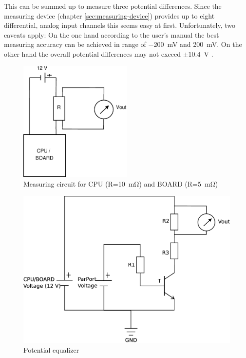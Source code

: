 This can be summed up to measure three potential differences. Since the
measuring device (chapter \ref{sec:measuring-device}) provides up to eight
differential, analog input channels this seems easy at first. Unfortunately,
two caveats apply: On the one hand according to the user's manual
\cite{NIManual2009} the best measuring accuracy can be achieved in range of
\SI{-200}{\milli\volt} and \SI{200}{\milli\volt}. On the other hand the overall
potential differences may not exceed $\pm$\SI{10.4}{\volt} \cite{NISpec2009}.

\begin{figure}
  \centering
    \includegraphics[width=0.5\textwidth]{fig/measuring-circuit.eps}
  \caption{Measuring circuit for CPU (R=\SI{10}{\milli\ohm}) and BOARD
(R=\SI{5}{\milli\ohm})}
  \label{fig:circuit}
\end{figure}

\begin{figure}
  \centering
    \includegraphics[width=\textwidth]{fig/potential-equalizer.eps}
  \caption{Potential equalizer}
  \label{fig:potential-equalizer}
\end{figure}

